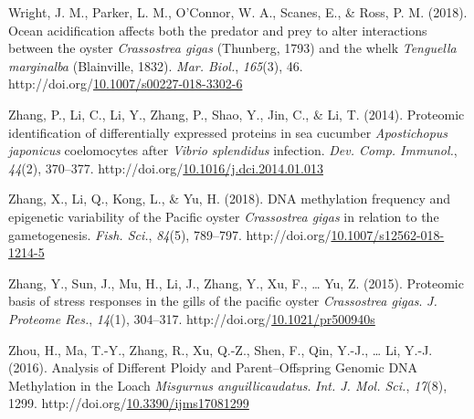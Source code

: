 \documentclass [11pt, proquest] {uwthesis}[2015/03/03]
\newlength{\cslhangindent}
\newenvironment{CSLReferences}%
{\setlength{\parindent}{0pt}%
\everypar{\setlength{\hangindent}{\cslhangindent}}\ignorespaces}%
{\par}
\begin{document}
\begin{CSLReferences}{1}{0}
\leavevmode\hypertarget{ref-Wright2018}{}%
Wright, J. M., Parker, L. M., O'Connor, W. A., Scanes, E., \& Ross, P. M. (2018). {Ocean acidification affects both the predator and prey to alter interactions between the oyster \emph{Crassostrea gigas} (Thunberg, 1793) and the whelk \emph{Tenguella marginalba} (Blainville, 1832)}. \emph{Mar. Biol.}, \emph{165}(3), 46. http://doi.org/\href{https://doi.org/10.1007/s00227-018-3302-6}{10.1007/s00227-018-3302-6}

\leavevmode\hypertarget{ref-Zhang2014}{}%
Zhang, P., Li, C., Li, Y., Zhang, P., Shao, Y., Jin, C., \& Li, T. (2014). {Proteomic identification of differentially expressed proteins in sea cucumber \emph{Apostichopus japonicus} coelomocytes after \emph{Vibrio splendidus} infection}. \emph{Dev. Comp. Immunol.}, \emph{44}(2), 370--377. http://doi.org/\href{https://doi.org/10.1016/j.dci.2014.01.013}{10.1016/j.dci.2014.01.013}

\leavevmode\hypertarget{ref-Zhang2018}{}%
Zhang, X., Li, Q., Kong, L., \& Yu, H. (2018). {DNA methylation frequency and epigenetic variability of the Pacific oyster \emph{Crassostrea gigas} in relation to the gametogenesis}. \emph{Fish. Sci.}, \emph{84}(5), 789--797. http://doi.org/\href{https://doi.org/10.1007/s12562-018-1214-5}{10.1007/s12562-018-1214-5}

\leavevmode\hypertarget{ref-Zhang2015}{}%
Zhang, Y., Sun, J., Mu, H., Li, J., Zhang, Y., Xu, F., \ldots{} Yu, Z. (2015). {Proteomic basis of stress responses in the gills of the pacific oyster \emph{Crassostrea gigas}}. \emph{J. Proteome Res.}, \emph{14}(1), 304--317. http://doi.org/\href{https://doi.org/10.1021/pr500940s}{10.1021/pr500940s}

\leavevmode\hypertarget{ref-Zhou2016}{}%
Zhou, H., Ma, T.-Y., Zhang, R., Xu, Q.-Z., Shen, F., Qin, Y.-J., \ldots{} Li, Y.-J. (2016). {Analysis of Different Ploidy and Parent--Offspring Genomic DNA Methylation in the Loach \emph{Misgurnus anguillicaudatus}}. \emph{Int. J. Mol. Sci.}, \emph{17}(8), 1299. http://doi.org/\href{https://doi.org/10.3390/ijms17081299}{10.3390/ijms17081299}

\end{CSLReferences}
\end{document}
